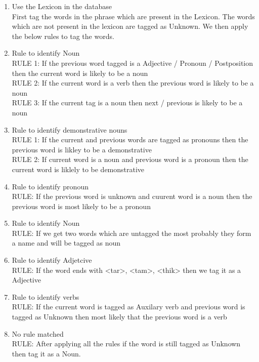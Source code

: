\begin{enumerate}
\item Use the Lexicon in the database \\
First tag the words in the phrase which are present in the Lexicon. The words which are not present in the lexicon are tagged as Unknown. We then apply the below rules to tag the words.

\item{Rule to identify Noun} \\
RULE 1: If the previous word tagged is a Adjective / Pronoun / Postposition then the current word is likely to be a noun \\	
RULE 2: If the current word is a verb then the previous word is likely to be a noun \\
RULE 3: If the current tag is a noun then next / previous is likely to be a noun
		
\item{Rule to identify demonstrative nouns} \\
RULE 1: If the current and previous words are tagged as pronouns then the previous word is likley to be a demonstrative \\
RULE 2: If current word is a noun and previous word is a pronoun then the current word is liklely to be demonstrative
		
\item{Rule to identify pronoun} \\
RULE: If the previous word is unknown and cuurent word is a noun then the previous word is most likely to be a pronoun
		
\item{Rule to identify Noun} \\		
RULE: If we get two words which are untagged the most probably they form a name and will be tagged as noun
		
\item{Rule to identify Adjetcive} \\
RULE: If the word ends with <tar>, <tam>, <thik> then we tag it as a Adjective
		
\item{Rule to identify verbs} \\
RULE: If the current word is tagged as Auxilary verb  and previous word is tagged as Unknown then most likely that the previous word is a verb

\item{No rule matched} \\
RULE: After applying all the rules if the word is still tagged as Unknown then tag it as a Noun.
		
\end{enumerate}
	

